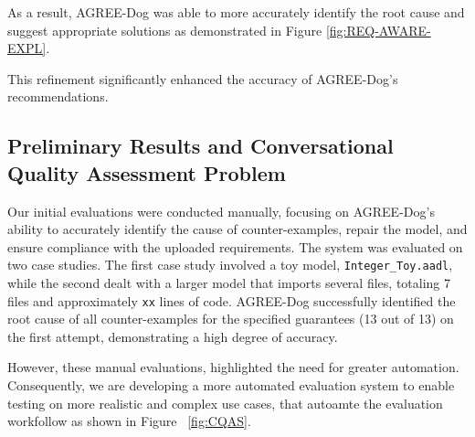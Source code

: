 As a result, AGREE-Dog was able to more accurately identify the root cause and suggest appropriate solutions as demonstrated in Figure \ref{fig:REQ-AWARE-EXPL}.


This refinement significantly enhanced the accuracy of AGREE-Dog’s recommendations.


\subsection{Preliminary Results and Conversational Quality Assessment Problem}
 
Our initial evaluations were conducted manually, focusing on AGREE-Dog's ability to accurately identify the cause of counter-examples, repair the model, and ensure compliance with the uploaded requirements. The system was evaluated on two case studies. The first case study involved a toy model, \texttt{Integer\_Toy.aadl}, while the second dealt with a larger model that imports several files, totaling 7 files and approximately \texttt{xx} lines of code. AGREE-Dog successfully identified the root cause of all counter-examples for the specified guarantees (13 out of 13) on the first attempt, demonstrating a high degree of accuracy.

However, these manual evaluations, highlighted the need for greater automation. Consequently, we are developing a more automated evaluation system to enable testing on more realistic and complex use cases, that autoamte the evaluation workfollow as shown in Figure ~\ref{fig:CQAS}.
 

